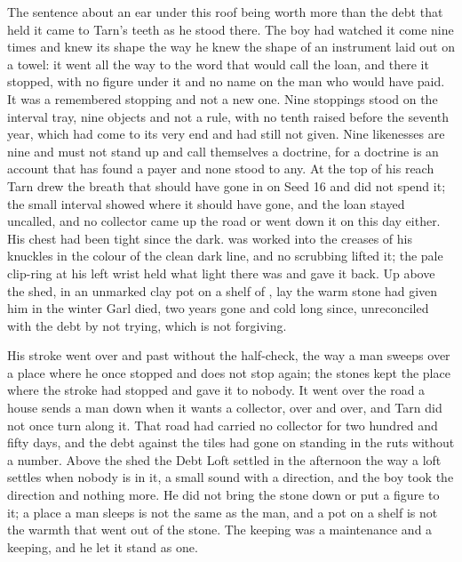 The sentence about an ear under this roof being worth more than the debt that held it came to Tarn's teeth as he stood there. The boy had watched it come nine times and knew its shape the way he knew the shape of an instrument laid out on a towel: it went all the way to the word that would call the loan, and there it stopped, with no figure under it and no name on the man who would have paid. It was a remembered stopping and not a new one. Nine stoppings stood on the interval tray, nine objects and not a rule, with no tenth raised before the seventh year, which had come to its very end and had still not given. Nine likenesses are nine and must not stand up and call themselves a doctrine, for a doctrine is an account that has found a payer and none stood to any. At the top of his reach Tarn drew the breath that should have gone in on Seed 16 and did not spend it; the small interval showed where it should have gone, and the loan stayed uncalled, and no collector came up the road or went down it on this day either. His chest had been tight since the dark.  was worked into the creases of his knuckles in the colour of the clean dark line, and no scrubbing lifted it; the pale clip-ring at his left wrist held what light there was and gave it back. Up above the shed, in an unmarked clay pot on a shelf of , lay the warm stone  had given him in the winter Garl died, two years gone and cold long since, unreconciled with the debt by not trying, which is not forgiving.

His stroke went over  and past  without the half-check, the way a man sweeps over a place where he once stopped and does not stop again; the stones kept the place where the stroke had stopped and gave it to nobody. It went over the road a house sends a man down when it wants a collector, over and over, and Tarn did not once turn along it. That road had carried no collector for two hundred and fifty days, and the debt against the tiles had gone on standing in the ruts without a number. Above the shed the Debt Loft settled in the afternoon the way a loft settles when nobody is in it, a small sound with a direction, and the boy took the direction and nothing more. He did not bring the stone down or put a figure to it; a place a man sleeps is not the same as the man, and a pot on a shelf is not the warmth that went out of the stone. The keeping was a maintenance and a keeping, and he let it stand as one.

\scenebreak

